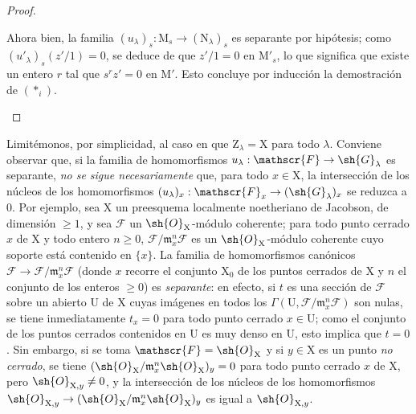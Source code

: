 \begin{proof}
\begin{enumerate}[label=(\roman*)]
  Ahora bien, la familia $(u_\lambda)_s:\mathrm{M}_s\to(\mathrm{N}_\lambda)_s$ es separante por hipótesis; como $(u'_\lambda)_s(z'/1)=0$, se deduce de  que $z'/1=0$ en $\mathrm{M}'_s$, lo que significa que existe un entero $r$ tal que $s^r z'=0$ en $\mathrm{M}'$. Esto concluye por inducción la demostración de $(*_i)$.
\end{enumerate}
\end{proof}

\begin{remark}[11.9.11]
\label{IV.11.9.11}
Limitémonos, por simplicidad, al caso en que $\mathrm{Z}_\lambda=\mathrm{X}$ para todo $\lambda$.
Conviene observar que, si la familia de homomorfismos $u_\lambda:\mathscr{F}\to\sh{G}_\lambda$ es separante, \emph{no se sigue necesariamente} que, para todo $x\in\mathrm{X}$, la intersección de los núcleos de los homomorfismos $(u_\lambda)_x:\mathscr{F}_x\to(\sh{G}_\lambda)_x$ se reduzca a $0$.
Por ejemplo, sea $\mathrm{X}$ un preesquema localmente noetheriano de Jacobson, de dimensión $\geq 1$, y sea $\mathscr{F}$ un $\sh{O}_\mathrm{X}$-módulo coherente; para todo punto cerrado $x$ de $\mathrm{X}$ y todo entero $n\geq 0$, $\mathscr{F}/\mathfrak{m}_x^n\mathscr{F}$ es un $\sh{O}_\mathrm{X}$-módulo coherente cuyo soporte está contenido en $\{x\}$.
La familia de homomorfismos canónicos $\mathscr{F}\to\mathscr{F}/\mathfrak{m}_x^n\mathscr{F}$ (donde $x$ recorre el conjunto $\mathrm{X}_0$ de los puntos cerrados de $\mathrm{X}$ y $n$ el conjunto de los enteros $\geq 0$) es \emph{separante}: en efecto, si $t$ es una sección de $\mathscr{F}$ sobre un abierto $\mathrm{U}$ de $\mathrm{X}$ cuyas imágenes en todos los $\Gamma(\mathrm{U},\mathscr{F}/\mathfrak{m}_x^n\mathscr{F})$ son nulas, se tiene inmediatamente $t_x=0$ para todo punto cerrado $x\in\mathrm{U}$; como el conjunto de los puntos cerrados contenidos en $\mathrm{U}$ es muy denso en $\mathrm{U}$, esto implica que $t=0$ .
Sin embargo, si se toma $\mathscr{F}=\sh{O}_\mathrm{X}$ y si $y\in\mathrm{X}$ es un punto \emph{no cerrado}, se tiene $(\sh{O}_\mathrm{X}/\mathfrak{m}_x^n\sh{O}_\mathrm{X})_y=0$ para todo punto cerrado $x$ de $\mathrm{X}$, pero $\sh{O}_{\mathrm{X},y}\neq 0$, y la intersección de los núcleos de los homomorfismos $\sh{O}_{\mathrm{X},y}\to(\sh{O}_\mathrm{X}/\mathfrak{m}_x^n\sh{O}_\mathrm{X})_y$ es igual a $\sh{O}_{\mathrm{X},y}$.
\end{remark}

